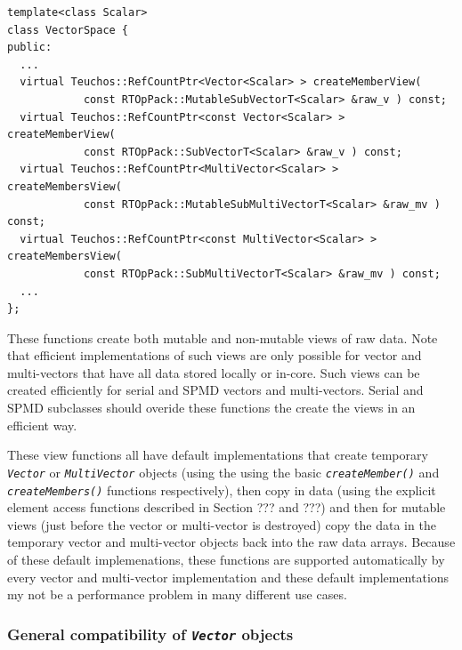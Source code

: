 {\scriptsize\begin{verbatim}
template<class Scalar>
class VectorSpace {
public:
  ...
  virtual Teuchos::RefCountPtr<Vector<Scalar> > createMemberView(
            const RTOpPack::MutableSubVectorT<Scalar> &raw_v ) const;
  virtual Teuchos::RefCountPtr<const Vector<Scalar> > createMemberView(
            const RTOpPack::SubVectorT<Scalar> &raw_v ) const;
  virtual Teuchos::RefCountPtr<MultiVector<Scalar> > createMembersView(
            const RTOpPack::MutableSubMultiVectorT<Scalar> &raw_mv ) const;
  virtual Teuchos::RefCountPtr<const MultiVector<Scalar> > createMembersView(
            const RTOpPack::SubMultiVectorT<Scalar> &raw_mv ) const;
  ...
};
\end{verbatim}}

These functions create both mutable and non-mutable views of raw data.
Note that efficient implementations of such views are only possible
for vector and multi-vectors that have all data stored locally or
in-core.  Such views can be created efficiently for serial and SPMD
vectors and multi-vectors.  Serial and SPMD subclasses should overide
these functions the create the views in an efficient way.

These view functions all have default implementations that create
temporary {}\texttt{\textit{Vector}} or
{}\texttt{\textit{Multi\-Vector}} objects (using the using the basic
{}\texttt{\textit{create\-Member()}} and
{}\texttt{\textit{create\-Members()}} functions respectively), then
copy in data (using the explicit element access functions described in
Section ??? and ???) and then for mutable views (just before the
vector or multi-vector is destroyed) copy the data in the temporary
vector and multi-vector objects back into the raw data arrays.
Because of these default implemenations, these functions are supported
automatically by every vector and multi-vector implementation and
these default implementations my not be a performance problem in many
different use cases.

%
\subsubsection{General compatibility of {}\texttt{\textit{Vector}} objects}
\label{tsfcore:sec:vec_spc_compatibility}
%

